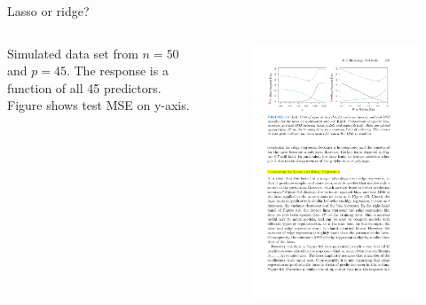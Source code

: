 \documentclass[mathserif, aspectratio=169]{beamer}
\begin{document}
\begin{frame}{Lasso or ridge?}


\begin{columns}
Simulated data set from $n=50$ and $p=45$.  The response is a function of all 45 predictors.  Figure shows test MSE on y-axis.\\~\\
\begin{figure}
\includegraphics[scale=1]{lasso-v-ridge-45variables}
\end{figure}


\end{columns}
\end{frame}
\end{document}
